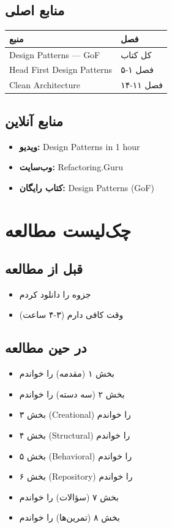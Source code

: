 \documentclass[12pt, a4paper]{article}
\begin{document}
\subsection{منابع اصلی}
\begin{center}
\begin{tabular}{|l|l|}
\hline
\textbf{منبع} & \textbf{فصل} \\
\hline
Design Patterns — GoF & کل کتاب \\
\hline
Head First Design Patterns & فصل ۱-۵ \\
\hline
Clean Architecture & فصل ۱۱-۱۴ \\
\hline
\end{tabular}
\end{center}

\subsection{منابع آنلاین}
\begin{itemize}
    \item \textbf{ویدیو:} Design Patterns in 1 hour
    \item \textbf{وب‌سایت:} Refactoring.Guru
    \item \textbf{کتاب رایگان:} Design Patterns (GoF)
\end{itemize}

\section{چک‌لیست مطالعه}

\subsection{قبل از مطالعه}
\begin{itemize}
    \item[$\square$] جزوه را دانلود کردم
    \item[$\square$] وقت کافی دارم (۳-۴ ساعت)
\end{itemize}

\subsection{در حین مطالعه}
\begin{itemize}
    \item[$\square$] بخش ۱ (مقدمه) را خواندم
    \item[$\square$] بخش ۲ (سه دسته) را خواندم
    \item[$\square$] بخش ۳ (Creational) را خواندم
    \item[$\square$] بخش ۴ (Structural) را خواندم
    \item[$\square$] بخش ۵ (Behavioral) را خواندم
    \item[$\square$] بخش ۶ (Repository) را خواندم
    \item[$\square$] بخش ۷ (سؤالات) را خواندم
    \item[$\square$] بخش ۸ (تمرین‌ها) را خواندم
\end{itemize}
\end{document}
